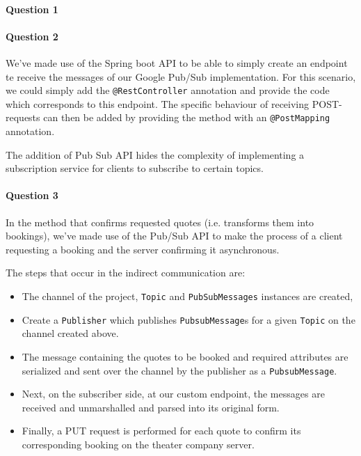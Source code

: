 \documentclass{ds-report}
\begin{document}
	\maketitle

	\paragraph{Question 1}
	\paragraph{Question 2} 
	We've made use of the Spring boot API to be able to simply create an endpoint te receive the messages of our Google Pub/Sub implementation. For this scenario, we could simply add the \texttt{@RestController} annotation and provide the code which corresponds to this endpoint. The specific behaviour of receiving POST-requests can then be added by providing the method with an \texttt{@PostMapping} annotation.
	
	The addition of Pub Sub API hides the complexity of implementing a subscription service for clients to subscribe to certain topics. 
	
	\paragraph{Question 3} 
	In the method that confirms requested quotes (i.e. transforms them into bookings), we've made use of the Pub/Sub API to make the process of a client requesting a booking and the server confirming it asynchronous. 
	
	The steps that occur in the indirect communication are:
	 \begin{itemize}
	 	\item The channel of the project, \texttt{Topic} and \texttt{PubSubMessages} instances are created,
	 	\item Create a \texttt{Publisher} which publishes \texttt{PubsubMessage}s for a given \texttt{Topic} on the channel created above.
	 	\item The message containing the quotes to be booked and required attributes are serialized and sent over the channel by the publisher as a \texttt{PubsubMessage}.
	 	\item Next, on the subscriber side, at our custom endpoint, the messages are received and unmarshalled and parsed into its original form.
	 	\item Finally, a PUT request is performed for each quote to confirm its corresponding booking on the theater company server.
	 \end{itemize}
 
\end{document}
